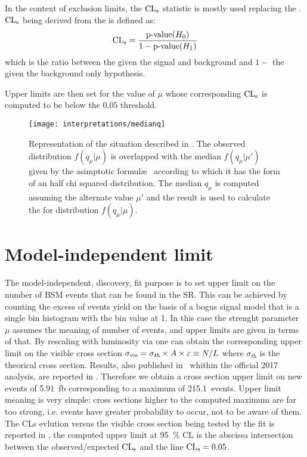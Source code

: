 In the context of exclusion limits, the $\cls$ statistic is mostly used replacing the \p. $\cls$ being derived from the \p is defined as:
\begin{equation}
	\cls=\frac{\text{p-value}(H_0)}{1-\text{p-value}(H_1)}
\end{equation}
which is the ratio between the \p given the signal and background and $1-$ the \p given the background only hypothesis.

Upper limits are then set for the value of $\mu$ whose corresponding $\cls$ is computed to be below the $0.05$ threshold.

\begin{figure}[pt]
\centering
\texttt{[image: interpretations/medianq]}
\caption{Representation of the situation described in \Sect{\ref{sec:sensitivity}}. The observed distribution $f\left(q_\mu \vert \mu \right)$ is overlapped with the median $f\left(q_\mu \vert \mu' \right)$ given by the asimptotic formul\ae~ according to which it has the form of an half chi squared distribution. The median $q_\mu$ is computed assuming the alternate value $\mu'$ and the result is used to calculate the \p for distribution $f\left(q_\mu \vert \mu \right)$.}
\label{fig:medianq}
\end{figure}

\section{Model-independent limit}
The model-independent, discovery, fit purpose is to set upper limit on the number of BSM events that can be found in the SR. This can be achieved by counting the excess of events yield on the basis of a bogus signal model that is a single bin histogram with the bin value at 1. In this case the strenght parameter $\mu$ assumes the meaning of number of events, and upper limits are given in terms of that. By rescaling with luminosity via \Eqn{\ref{eqn:Nevents}} one can obtain the corresponding upper limit on the visible cross section $\sigma_\textup{vis}=\sigma_\textit{th}\times A\times\epsilon \equiv N/L$ where $\sigma_\textit{th}$ is the theorical cross section. Results, also published in~\cite{paperMP} whithin the official 2017 \mph analysis, are reported in \Tab{\ref{table.results.exclxsec.pval.upperlimit.SR}}. Therefore we obtain a cross section upper limit on new events of \SI{5.91}{fb} corresponding to a maximum of \SI{215.1}{events}. Upper limit meaning is very simple: cross sections higher to the computed maximum are far too strong, i.e. events have greater probability to occur, not to be aware of them. The CLs evlution versus the visible cross section being tested by the fit is reported in \Fig{\ref{fig:cls}}, the computed upper limit at \SI{95}{\percent} CL is the abscissa intersection between the observed/expected $\cls$ and the line $\cls=0.05$.



